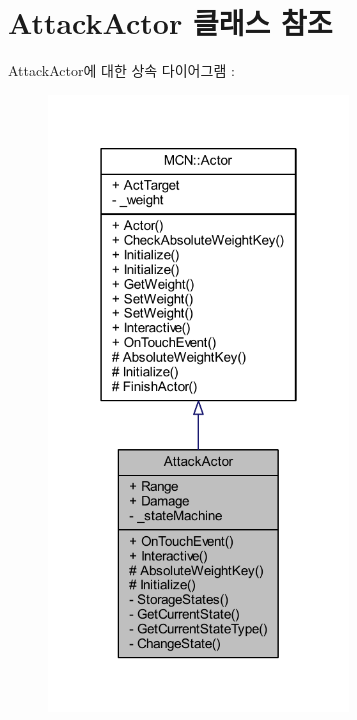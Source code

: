 \hypertarget{class_attack_actor}{}\section{Attack\+Actor 클래스 참조}
\label{class_attack_actor}


Attack\+Actor에 대한 상속 다이어그램 \+: 
\nopagebreak
\begin{figure}[H]
\begin{center}
\leavevmode
\includegraphics[width=226pt]{class_attack_actor__inherit__graph}
\end{center}
\end{figure}


